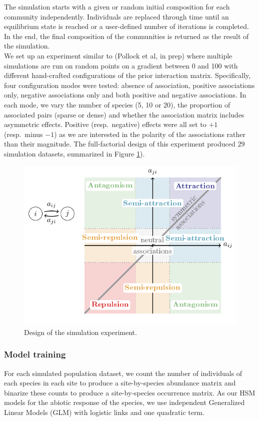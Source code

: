 \documentclass[10pt,a4paper]{article}
\begin{document}
The simulation starts with a given or random initial composition for each community independently. Individuals are replaced through time until an equilibrium state is reached or a user-defined number of iterations is completed. In the end, the final composition of the communities is returned as the result of the simulation.\\

We set up an experiment similar to (Pollock et al, in prep) where multiple simulations are run on random points on a gradient between 0 and 100 with different hand-crafted configurations of the prior interaction matrix. Specifically, four configuration modes were tested: absence of association, positive associations only, negative associations only and both positive and negative associations. In each mode, we vary the number of species (5, 10 or 20), the proportion of associated pairs (sparse or dense) and whether the association matrix includes asymmetric effects. Positive (resp.\ negative) effects were all set to $+1$ (resp.\ minus $-1$) as we are interested in the polarity of the associations rather than their magnitude. The full-factorial design of this experiment produced 29 simulation datasets, summarized in Figure \ref{simexp}).\\

\begin{figure}[bthp]
  \centering
  \includegraphics[page=4]{tikz_figures.pdf}
  \caption{Design of the simulation experiment.}
  \label{simexp}
\end{figure}

\subsubsection{Model training}
For each simulated population dataset, we count the number of individuals of each species in each site to produce a site-by-species abundance matrix and binarize these counts to produce a site-by-species occurrence matrix. 
As our HSM models for the abiotic response of the species, we use independent Generalized Linear Models (GLM) with logistic links and one quadratic term.\\
\end{document}
